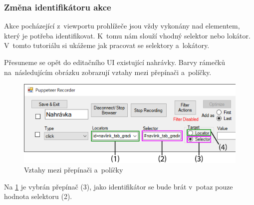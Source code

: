 \documentclass[12pt, a4paper, twoside]{article}
\begin{document}
	\subsubsection{Změna identifikátoru akce}
	Akce pocházející z~viewportu prohlížeče jsou vždy vykonány nad elementem, který je potřeba identifikovat. K~tomu nám slouží vhodný selektor nebo lokátor. V~tomto tutoriálu si ukážeme jak pracovat se selektory a~lokátory.
	
	Přesuneme se opět do editačního UI existující nahrávky. Barvy rámečků na~následujícím obrázku zobrazují vztahy mezi přepínači a~políčky.
	\nopagebreak
	\begin{figure}[H]
		\centering
		\includegraphics[width=1.0\textwidth]{identifiers2.png}
		\caption{Vztahy mezi přepínači a~políčky}
		\label{fig:identifierRelationship}
	\end{figure}
	Na \cref{fig:identifierRelationship} je vybrán přepínač (3), jako identifikátor se bude brát v~potaz pouze hodnota selektoru (2).
	
\end{document}
